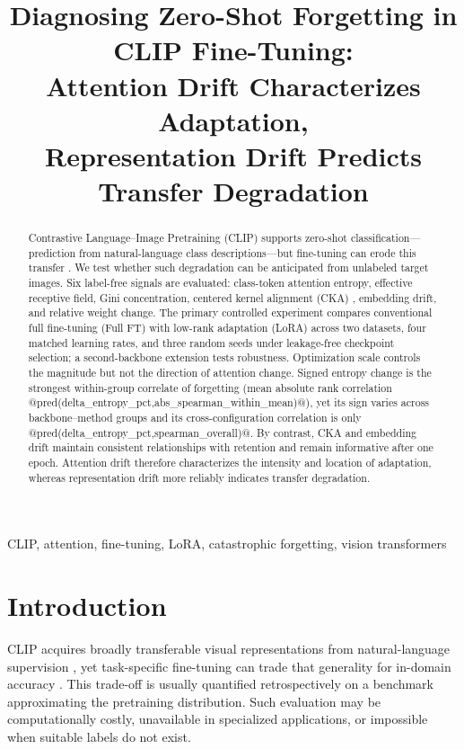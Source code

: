 \documentclass[conference]{IEEEtran}
\title{Diagnosing Zero-Shot Forgetting in CLIP Fine-Tuning:\\
Attention Drift Characterizes Adaptation,\\
Representation Drift Predicts Transfer Degradation}
\author{\IEEEauthorblockN{Ruize Xia}
\IEEEauthorblockA{\textit{High School Student, Nanjing Foreign Language School}\\
Nanjing, Jiangsu, China\\
xiaruize0911@gmail.com}}
\begin{document}
\maketitle

\begin{abstract}
Contrastive Language--Image Pretraining (CLIP) supports zero-shot classification---prediction from natural-language class descriptions---but fine-tuning can erode this transfer \cite{radford2021learning,kumar2022finetuning}. We test whether such degradation can be anticipated from unlabeled target images. Six label-free signals are evaluated: class-token attention entropy, effective receptive field, Gini concentration, centered kernel alignment (CKA) \cite{kornblith2019similarity}, embedding drift, and relative weight change. The primary controlled experiment compares conventional full fine-tuning (Full FT) with low-rank adaptation (LoRA) \cite{hu2022lora} across two datasets, four matched learning rates, and three random seeds under leakage-free checkpoint selection; a second-backbone extension tests robustness. Optimization scale controls the magnitude but not the direction of attention change. Signed entropy change is the strongest within-group correlate of forgetting (mean absolute rank correlation @pred(delta_entropy_pct,abs_spearman_within_mean)@), yet its sign varies across backbone--method groups and its cross-configuration correlation is only @pred(delta_entropy_pct,spearman_overall)@. By contrast, CKA and embedding drift maintain consistent relationships with retention and remain informative after one epoch. Attention drift therefore characterizes the intensity and location of adaptation, whereas representation drift more reliably indicates transfer degradation.
\end{abstract}

\begin{IEEEkeywords}
CLIP, attention, fine-tuning, LoRA, catastrophic forgetting, vision transformers
\end{IEEEkeywords}

\section{Introduction}
CLIP acquires broadly transferable visual representations from natural-language supervision \cite{radford2021learning}, yet task-specific fine-tuning can trade that generality for in-domain accuracy \cite{kumar2022finetuning}. This trade-off is usually quantified retrospectively on a benchmark approximating the pretraining distribution. Such evaluation may be computationally costly, unavailable in specialized applications, or impossible when suitable labels do not exist.
\end{document}

